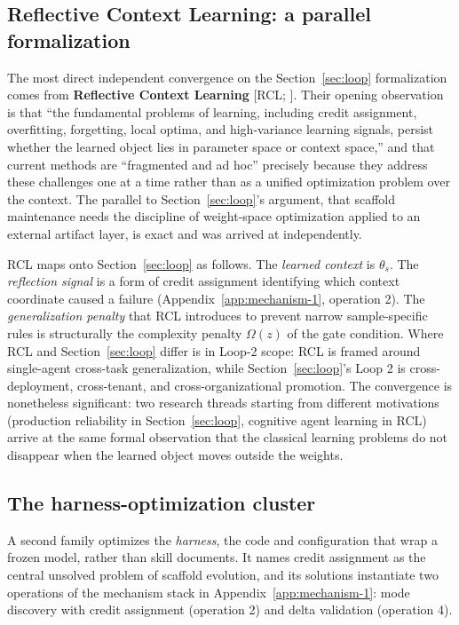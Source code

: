 \documentclass[
  11pt,
]{article}
\newcounter{none} %
\begin{document}
\subsection{Reflective Context Learning: a parallel formalization}\label{app:families-5}

The most direct independent convergence on the Section~\ref{sec:loop} formalization comes from \textbf{Reflective Context Learning} {[}RCL; \cite{vassilyev2026rcl}{]}. Their opening observation is that ``the fundamental problems of learning, including credit assignment, overfitting, forgetting, local optima, and high-variance learning signals, persist whether the learned object lies in parameter space or context space,'' and that current methods are ``fragmented and ad hoc'' precisely because they address these challenges one at a time rather than as a unified optimization problem over the context. The parallel to Section~\ref{sec:loop}'s argument, that scaffold maintenance needs the discipline of weight-space optimization applied to an external artifact layer, is exact and was arrived at independently.

RCL maps onto Section~\ref{sec:loop} as follows. The \emph{learned context} is \(\theta_s\). The \emph{reflection signal} is a form of credit assignment identifying which context coordinate caused a failure (Appendix~\ref{app:mechanism-1}, operation 2). The \emph{generalization penalty} that RCL introduces to prevent narrow sample-specific rules is structurally the complexity penalty \(\Omega(z)\) of the gate condition. Where RCL and Section~\ref{sec:loop} differ is in Loop-2 scope: RCL is framed around single-agent cross-task generalization, while Section~\ref{sec:loop}'s Loop 2 is cross-deployment, cross-tenant, and cross-organizational promotion. The convergence is nonetheless significant: two research threads starting from different motivations (production reliability in Section~\ref{sec:loop}, cognitive agent learning in RCL) arrive at the same formal observation that the classical learning problems do not disappear when the learned object moves outside the weights.

\subsection{The harness-optimization cluster}\label{app:families-6}

A second family optimizes the \emph{harness}, the code and configuration that wrap a frozen model, rather than skill documents. It names credit assignment as the central unsolved problem of scaffold evolution, and its solutions instantiate two operations of the mechanism stack in Appendix~\ref{app:mechanism-1}: mode discovery with credit assignment (operation 2) and delta validation (operation 4).
\end{document}
